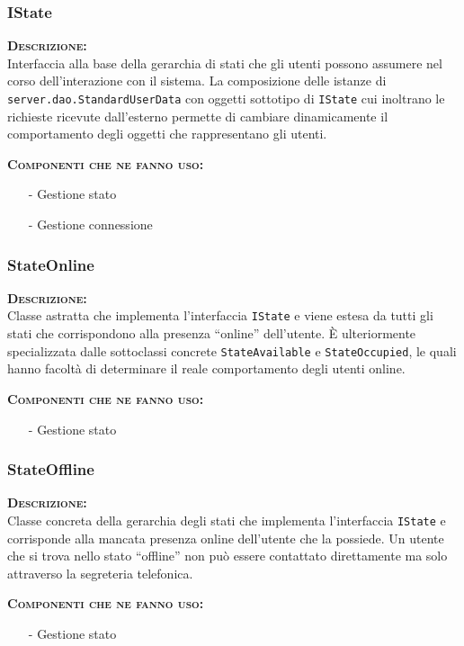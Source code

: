 \subsubsection{IState}
\begin{description}
	\item{\scshape\bfseries Descrizione:}\\
Interfaccia alla base della gerarchia di stati che gli utenti possono assumere nel corso dell'interazione con il sistema. La composizione delle istanze di \texttt{server.dao.StandardUserData} con oggetti sottotipo di \texttt{IState} cui inoltrano le richieste ricevute dall'esterno permette di cambiare dinamicamente il comportamento degli oggetti che rappresentano gli utenti.
	\item{\scshape\bfseries Componenti che ne fanno uso:}
	\begin{itemize}[noitemsep,nolistsep]
	  \item[-] Gestione stato
	  \item[-] Gestione connessione
	\end{itemize}
\end{description}

\subsubsection{StateOnline}
\begin{description}
	\item{\scshape\bfseries Descrizione:}\\
Classe astratta che implementa l'interfaccia \texttt{IState} e viene estesa da tutti gli stati che corrispondono alla presenza ``online'' dell'utente. È ulteriormente specializzata dalle sottoclassi concrete \texttt{StateAvailable} e \texttt{StateOccupied}, le quali hanno facoltà di determinare il reale comportamento degli utenti online.
	\item{\scshape\bfseries Componenti che ne fanno uso:}
	\begin{itemize}[noitemsep,nolistsep]
	  \item[-] Gestione stato
	\end{itemize}
\end{description}

\subsubsection{StateOffline}
\begin{description}
	\item{\scshape\bfseries Descrizione:}\\
Classe concreta della gerarchia degli stati che implementa l'interfaccia \texttt{IState} e corrisponde alla mancata presenza online dell'utente che la possiede. Un utente che si trova nello stato ``offline'' non può essere contattato direttamente ma solo attraverso la segreteria telefonica.
	\item{\scshape\bfseries Componenti che ne fanno uso:}
	\begin{itemize}[noitemsep,nolistsep]
	  \item[-] Gestione stato
	\end{itemize}
\end{description}

